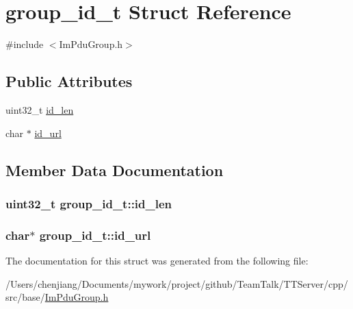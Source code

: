 \hypertarget{structgroup__id__t}{}\section{group\+\_\+id\+\_\+t Struct Reference}
\label{structgroup__id__t}


{\ttfamily \#include $<$Im\+Pdu\+Group.\+h$>$}

\subsection*{Public Attributes}
\begin{DoxyCompactItemize}
\item 
uint32\+\_\+t \hyperlink{structgroup__id__t_ac8d3743e75f8945ed068a1a564ea4045}{id\+\_\+len}
\item 
char $\ast$ \hyperlink{structgroup__id__t_af5e7db89c2ad745e47c83d3945369dd7}{id\+\_\+url}
\end{DoxyCompactItemize}


\subsection{Member Data Documentation}
\hypertarget{structgroup__id__t_ac8d3743e75f8945ed068a1a564ea4045}{}
\subsubsection[{id\+\_\+len}]{\setlength{\rightskip}{0pt plus 5cm}uint32\+\_\+t group\+\_\+id\+\_\+t\+::id\+\_\+len}\label{structgroup__id__t_ac8d3743e75f8945ed068a1a564ea4045}
\hypertarget{structgroup__id__t_af5e7db89c2ad745e47c83d3945369dd7}{}
\subsubsection[{id\+\_\+url}]{\setlength{\rightskip}{0pt plus 5cm}char$\ast$ group\+\_\+id\+\_\+t\+::id\+\_\+url}\label{structgroup__id__t_af5e7db89c2ad745e47c83d3945369dd7}


The documentation for this struct was generated from the following file\+:\begin{DoxyCompactItemize}
\item 
/\+Users/chenjiang/\+Documents/mywork/project/github/\+Team\+Talk/\+T\+T\+Server/cpp/src/base/\hyperlink{_im_pdu_group_8h}{Im\+Pdu\+Group.\+h}\end{DoxyCompactItemize}
